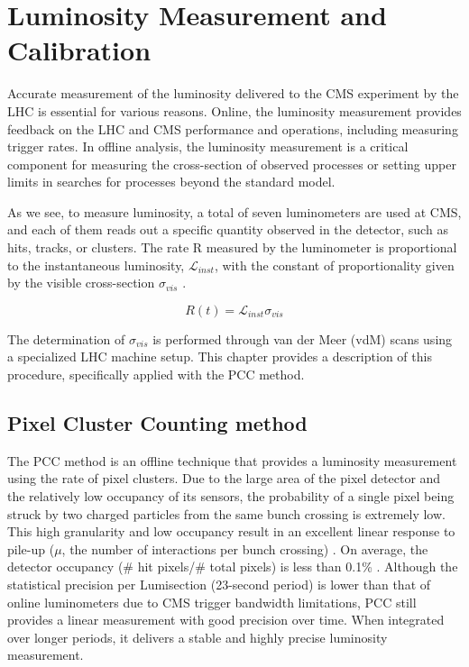\chapter{Luminosity Measurement and Calibration}
\label{ch3}

Accurate measurement of the luminosity delivered to the CMS experiment by the LHC is essential for various reasons. Online, the luminosity measurement provides feedback on the LHC and CMS performance and operations, including measuring trigger rates. In offline analysis, the luminosity measurement is a critical component for measuring the cross-section of observed processes or setting upper limits in searches for processes beyond the standard model.

As we see, to measure luminosity, a total of seven luminometers are used at CMS, and each of them reads out a specific quantity observed in the detector, such as hits, tracks, or clusters. The rate R measured by the luminometer is proportional to the instantaneous luminosity, $\mathcal{L}_{inst}$, with the constant of proportionality given by the visible cross-section $\sigma_{vis}$ \cite{pas_18}.

\begin{equation}
R(t)=\mathcal{L}_{inst}\sigma_{vis}
\label{lumi_exp_gen}
\end{equation}

The determination of $\sigma_{vis}$ is performed through van der Meer (vdM) scans using a specialized LHC machine setup. This chapter provides a description of this procedure, specifically applied with the PCC method.


\section{Pixel Cluster Counting method}
\label{Pixel Cluster Counting method}

The PCC method is an offline technique that provides a luminosity measurement using the rate of pixel clusters. Due to the large area of the pixel detector and the relatively low occupancy of its sensors, the probability of a single pixel being struck by two charged particles from the same bunch crossing is extremely low. This high granularity and low occupancy result in an excellent linear response to pile-up (\(\mu\), the number of interactions per bunch crossing) \cite{PCC_PAS_12_001}. On average, the detector occupancy (# hit pixels/# total pixels) is less than 0.1\% \cite{lumi_precise_2015_2016}.  
Although the statistical precision per Lumisection (23-second period) is lower than that of online luminometers due to CMS trigger bandwidth limitations, PCC still provides a linear measurement with good precision over time. When integrated over longer periods, it delivers a stable and highly precise luminosity measurement.  

